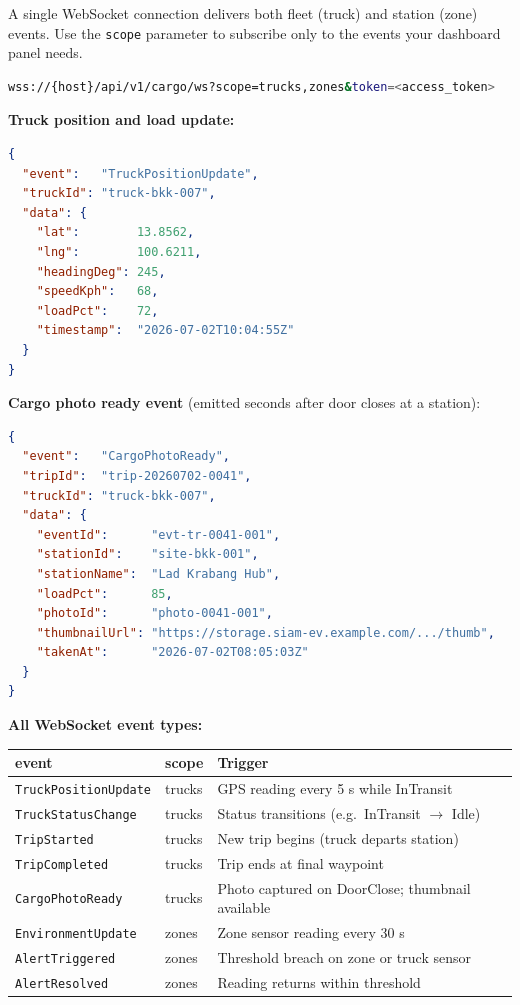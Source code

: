 \documentclass{article}
\begin{document}
A single WebSocket connection delivers both fleet (truck) and station (zone)
events. Use the \texttt{scope} parameter to subscribe only to the events your
dashboard panel needs.

\begin{lstlisting}[language=bash]
wss://{host}/api/v1/cargo/ws?scope=trucks,zones&token=<access_token>
\end{lstlisting}

\textbf{Truck position and load update:}
\begin{lstlisting}[language=json, caption=TruckPositionUpdate event]
{
  "event":   "TruckPositionUpdate",
  "truckId": "truck-bkk-007",
  "data": {
    "lat":        13.8562,
    "lng":        100.6211,
    "headingDeg": 245,
    "speedKph":   68,
    "loadPct":    72,
    "timestamp":  "2026-07-02T10:04:55Z"
  }
}
\end{lstlisting}

\textbf{Cargo photo ready event} (emitted seconds after door closes at a station):
\begin{lstlisting}[language=json, caption=CargoPhotoReady event]
{
  "event":   "CargoPhotoReady",
  "tripId":  "trip-20260702-0041",
  "truckId": "truck-bkk-007",
  "data": {
    "eventId":      "evt-tr-0041-001",
    "stationId":    "site-bkk-001",
    "stationName":  "Lad Krabang Hub",
    "loadPct":      85,
    "photoId":      "photo-0041-001",
    "thumbnailUrl": "https://storage.siam-ev.example.com/.../thumb",
    "takenAt":      "2026-07-02T08:05:03Z"
  }
}
\end{lstlisting}

\textbf{All WebSocket event types:}

\begin{center}
\begin{tabular}{lll}
\toprule
\textbf{event} & \textbf{scope} & \textbf{Trigger}\\
\midrule
\texttt{TruckPositionUpdate} & trucks & GPS reading every 5 s while InTransit\\
\texttt{TruckStatusChange}   & trucks & Status transitions (e.g.\ InTransit $\to$ Idle)\\
\texttt{TripStarted}         & trucks & New trip begins (truck departs station)\\
\texttt{TripCompleted}       & trucks & Trip ends at final waypoint\\
\texttt{CargoPhotoReady}     & trucks & Photo captured on DoorClose; thumbnail available\\
\texttt{EnvironmentUpdate}   & zones  & Zone sensor reading every 30 s\\
\texttt{AlertTriggered}      & zones  & Threshold breach on zone or truck sensor\\
\texttt{AlertResolved}       & zones  & Reading returns within threshold\\
\bottomrule
\end{tabular}
\end{center}
\end{document}

